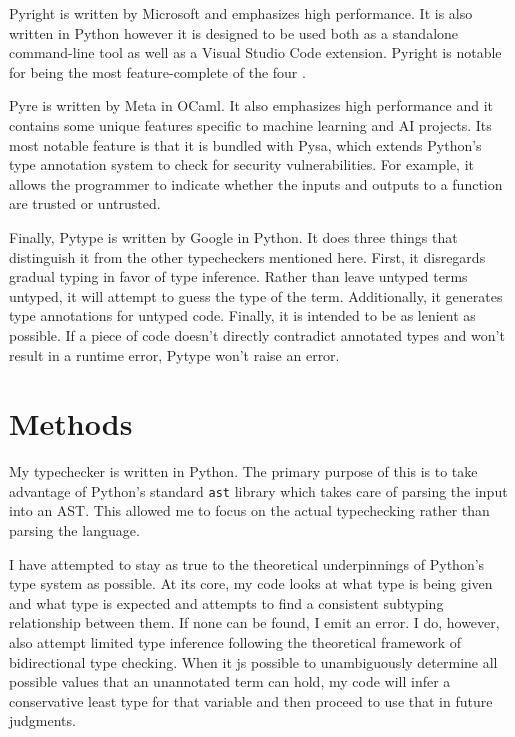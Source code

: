 \documentclass[10pt,twocolumn]{article}
\begin{document}
Pyright is written by Microsoft and emphasizes high performance. It is also written in Python however it is designed to be used both as a standalone command-line tool as well as a Visual Studio Code extension. Pyright is notable for being the most feature-complete of the four \cite{tctestresults}.

Pyre is written by Meta in OCaml. It also emphasizes high performance and it contains some unique features specific to machine learning and AI projects. Its most notable feature is that it is bundled with Pysa, which extends Python's type annotation system to check for security vulnerabilities. For example, it allows the programmer to indicate whether the inputs and outputs to a function are trusted or untrusted.

Finally, Pytype is written by Google in Python. It does three things that distinguish it from the other typecheckers mentioned here. First, it disregards gradual typing in favor of type inference. Rather than leave untyped terms untyped, it will attempt to guess the type of the term. Additionally, it generates type annotations for untyped code. Finally, it is intended to be as lenient as possible. If a piece of code doesn't directly contradict annotated types and won't result in a runtime error, Pytype won't raise an error. 

\section{Methods}

My typechecker is written in Python. The primary purpose of this is to take advantage of Python's standard \verb|ast| library which takes care of parsing the input into an AST. This allowed me to focus on the actual typechecking rather than parsing the language.

I have attempted to stay as true to the theoretical underpinnings of Python's type system as possible. At its core, my code looks at what type is being given and what type is expected and attempts to find a consistent subtyping relationship between them. If none can be found, I emit an error. I do, however, also attempt limited type inference following the theoretical framework of bidirectional type checking. When it js possible to unambiguously determine all possible values that an unannotated term can hold, my code will infer a conservative least type for that variable and then proceed to use that in future judgments. 
\end{document}

